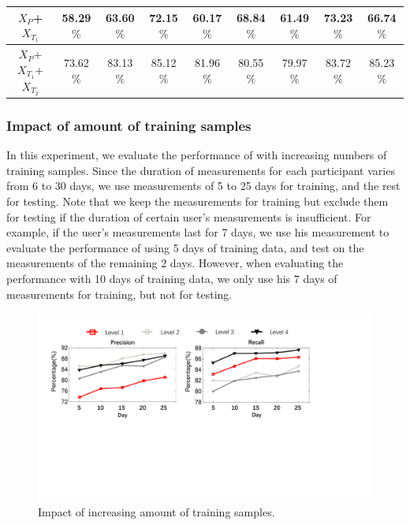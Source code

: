 \begin{table}[h]
\begin{tabular}{|c|c|c|c|c|c|c|c|c|}
$X_{P}$+$X_{T_1}$                   & 58.29$\%$               & 63.60$\%$                                 & 72.15$\%$                & 60.17$\%$            & 68.84$\%$               & 61.49$\%$                                 & 73.23$\%$               & 66.74$\%$\\ \hline


$X_{P}$+$X_{T_1}$+$X_{T_2}$ & 73.62$\%$   & 83.13$\%$                                 & 85.12$\%$               & 81.96$\%$            & 80.55$\%$   & 79.97$\%$
  & 83.72$\%$               & 85.23$\%$                                  \\ \hline
  \end{tabular}
\end{table}


\subsubsection{Impact of amount of training samples}
In this experiment, we evaluate the performance of \sysname with increasing numbers of training samples.
Since the duration of measurements for each participant varies from 6 to 30 days, we use measurements of 5 to 25 days for training, and the rest for testing.
Note that we keep the measurements for training but exclude them for testing if the duration of certain user's measurements is insufficient.
For example, if the user's measurements last for 7 days, we use his measurement to evaluate the performance of using 5 days of training data, and test on the measurements of the remaining 2 days.
However, when evaluating the performance with 10 days of training data, we only use his 7 days of measurements for training, but not for testing.

\begin{figure}[h]
  \centering
  \includegraphics[width=0.9\columnwidth]{./img/performance_under_days1.pdf}
  \caption{Impact of increasing amount of training samples.}
  \label{fig:per_under_train_days}
\end{figure}

